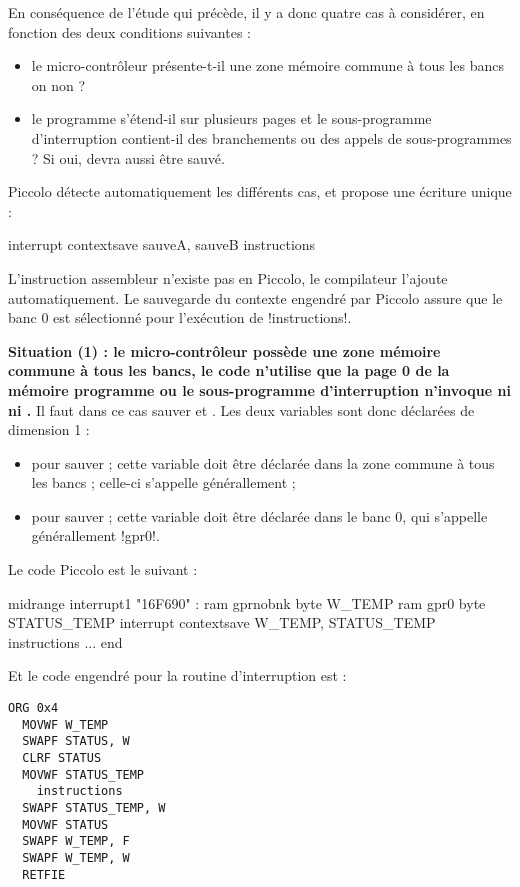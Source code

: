 En conséquence de l'étude qui précède, il y a donc quatre cas à considérer, en fonction des deux conditions suivantes :
\begin{itemize}
  \item le micro-contrôleur présente-t-il une zone mémoire commune à tous les bancs on non ?
  \item le programme s’étend-il sur plusieurs pages et le sous-programme d’interruption contient-il des branchements ou des appels de sous-programmes ? Si oui,  devra aussi être sauvé.
\end{itemize}


Piccolo détecte automatiquement les différents cas, et propose une écriture unique :
\begin{piccolo}
interrupt contextsave sauveA, sauveB {
  instructions
}
\end{piccolo}

L'instruction assembleur  n'existe pas en Piccolo, le compilateur l'ajoute automatiquement. Le sauvegarde du contexte engendré par Piccolo assure que le banc 0 est sélectionné pour l'exécution de \pic!instructions!.

\textbf{Situation (1) : le micro-contrôleur possède une zone mémoire commune à tous les bancs, le code n'utilise que la page 0 de la mémoire programme ou le sous-programme d'interruption n'invoque ni  ni .} Il faut dans ce cas sauver  et . Les deux variables sont donc déclarées de dimension 1 :
\begin{itemize}
  \item {} pour sauver  ; cette variable doit être déclarée dans la zone commune à tous les bancs ; celle-ci s'appelle générallement  ; 
  \item {} pour sauver  ; cette variable doit être déclarée dans le banc 0, qui s'appelle générallement \pic!gpr0!. 
\end{itemize}


Le code Piccolo est le suivant :

\begin{piccolo}
midrange interrupt1 "16F690" :
ram gprnobnk {
  byte W_TEMP
}
ram gpr0 {
  byte STATUS_TEMP  
}
interrupt contextsave W_TEMP, STATUS_TEMP {
  instructions
}
...
end
\end{piccolo}

Et le code engendré pour la routine d'interruption est :
\begin{lstlisting}[language=assembleur]
  ORG 0x4
  MOVWF W_TEMP
  SWAPF STATUS, W
  CLRF STATUS
  MOVWF STATUS_TEMP
    instructions
  SWAPF STATUS_TEMP, W
  MOVWF STATUS
  SWAPF W_TEMP, F
  SWAPF W_TEMP, W
  RETFIE
\end{lstlisting}



